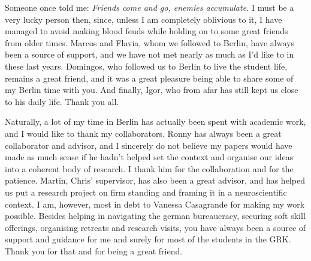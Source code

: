 Someone once told me: \emph{Friends come and go, enemies accumulate.} I must be a very lucky person then, since, unless I am completely oblivious to it, I have managed to avoid
making blood feuds while holding on to some great friends from older times. Marcos and Flavia, whom we followed to Berlin, have always been a source of support, and we have not 
met nearly as much as I'd like to in these last years. Domingos, who followed us to Berlin to live the student life, remains a great friend, and it was a great pleasure being able to
share some of my Berlin time with you. And finally, Igor, who from afar has still kept us close to his daily life. Thank you all.\par

Naturally, a lot of my time in Berlin has actually been spent with academic work, and I would like to thank my collaborators. Ronny has always been a great collaborator and advisor, and 
I sincerely
do not believe my papers would have made as much sense if he hadn't helped set the context and organise our ideas into a coherent body of research. I thank him for the collaboration
and for the patience. Martin, Chris' supervisor, has also been a great advisor, and has helped us put a research project on firm standing and framing it in a neuroscientific context. I am,
however, most in debt to Vanessa Casagrande for making my work possible. Besides helping in navigating the german bureaucracy, securing soft skill offerings, organising retreats 
and research visits, you have always been a source of support and guidance for me and surely for most of the students in the GRK. Thank you for that and for being a great friend.\par

